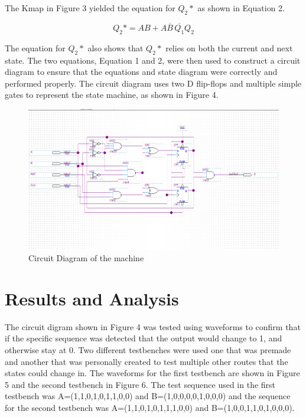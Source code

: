 \documentclass[CMPE]{KGCOEReport}
\begin{document}
The Kmap in Figure 3 yielded the equation for $Q_{2}*$ as shown in Equation 2.

\begin{equation}
	Q_{2}* = AB + A\overline{B}\,\overline{Q_{1}}Q_{2}
	\label{eq:Equation 1}
\end{equation}

The equation for $Q_{2}*$ also shows that $Q_{2}*$ relies on both the current and next state. The two equations, Equation 1 and 2, were then used to construct a circuit diagram to ensure that the equations and state diagram were correctly and performed properly. The circuit diagram uses two D flip-flops and multiple simple gates to represent the state machine, as shown in Figure 4.

\begin{figure}[H]
	\centering
	\includegraphics[width=\textwidth]{QuartusL9}
	\caption{Circuit Diagram of the machine}
	\label{fig:Figure 4}
\end{figure}

\section*{Results and Analysis}
The circuit digram shown in Figure 4 was tested using waveforms to confirm that if the specific sequence was detected that the output would change to 1, and otherwise stay at 0. Two different testbenches were used one that was premade and another that was personally created to test multiple other routes that the states could change in. The waveforms for the first testbench are shown in Figure 5 and the second testbench in Figure 6. The test sequence used in the first testbench was A=(1,1,0,1,0,1,1,0,0) and B=(1,0,0,0,0,1,0,0,0) and the sequence for the second testbench was A=(1,1,0,1,0,1,1,1,0,0) and B=(1,0,0,1,1,0,1,0,0,0).
\end{document}
